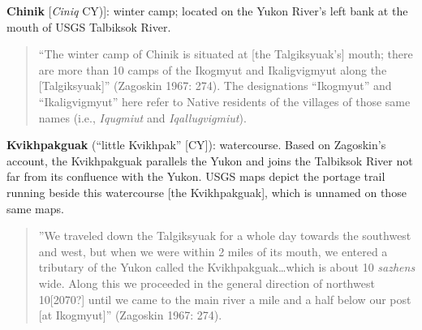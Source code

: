 \begin{hang}
\textbf{Chinik} [\textit{Ciniq} CY)]: winter camp; located on the Yukon River’s left bank at the mouth of USGS Talbiksok River.



\begin{quote}“The winter camp of Chinik is situated at [the Talgiksyuak’s] mouth; there are more than 10 camps of the Ikogmyut and Ikaligvigmyut along the [Talgiksyuak]” (Zagoskin 1967: 274). The designations “Ikogmyut” and “Ikaligvigmyut” here refer to Native residents of the villages of those same names (i.e., \textit{Iqugmiut} and \textit{Iqallugvigmiut}).
\end{quote}



\textbf{Kvikhpakguak} (“little Kvikhpak” [CY]): watercourse. Based on Zagoskin’s account, the Kvikhpakguak parallels the Yukon and joins the Talbiksok River not far from its confluence with the Yukon. USGS maps depict the portage trail running beside this watercourse [the Kvikhpakguak], which is unnamed on those same maps.



\begin{quote}”We traveled down the Talgiksyuak for a whole day towards the southwest and west, but when we were within 2 miles of its mouth, we entered a tributary of the Yukon called the Kvikhpakguak…which is about 10 \textit{sazhens} wide. Along this we proceeded in the general direction of northwest 10[2070?] until we came to the main river a mile and a half below our post [at Ikogmyut]” (Zagoskin 1967: 274).
\end{quote}



\end{hang}








\label{pratt-ch-end}
